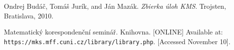\documentclass[11pt,a5paper]{article}
\begin{document}
\begin{thebibliography}{9}
 Ondrej Budáč, Tomáš Jurík, and Ján Mazák. 
	\emph{Zbierka úloh KMS}. Trojsten, Bratislava, 2010.
	
 Matematický korespondenční seminář. Knihovna. [ONLINE] Available at: \texttt{https://mks.mff.cuni.cz/library/library.php}. [Accessed November 10].
\end{thebibliography}
\end{document}
